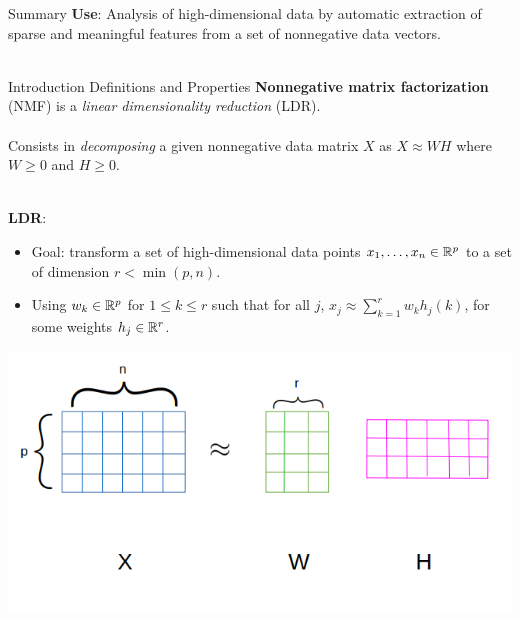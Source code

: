 \begin{frame}{Summary}
    \textbf{Use}: Analysis of high-dimensional data by automatic extraction of sparse and meaningful features from a set of nonnegative data vectors.\\
    ~\\
    \tableofcontents
\end{frame}

\begin{frame}{Introduction Definitions and Properties}
     \textbf{Nonnegative matrix factorization} (NMF) is a \emph{linear dimensionality reduction} (LDR). \\
         ~\\
         

     Consists in \emph{decomposing} a given nonnegative data matrix $X$ as $X \approx W H$ where $W \geqslant 0$ and $H \geqslant 0$. %
     
          ~\\
          
     \textbf{LDR}:
     \begin{itemize}
         \item Goal: transform a set of high-dimensional data points $x_1, \dots, x_n \in \mathbb{R}^{p}$ to a set of dimension $r < \min(p,n)$.
         \item Using $w_k \in \mathbb{R}^p$ for $1 \leqslant k \leqslant r$ such that for all $j$, $x_j \approx \sum_{k = 1}^{r} w_{k} h_{j}(k)$, for some weights $h_j\in \mathbb{R}^r$.
     \end{itemize}     
     \centering
\includegraphics[scale=0.3]{../images/matrices.png}


\end{frame}

